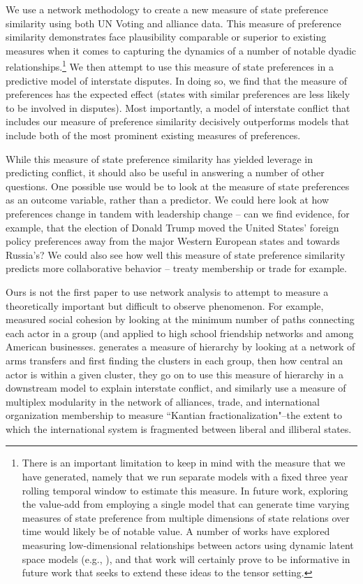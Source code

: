 \documentclass[12pt,pdflatex]{elsarticle}
\begin{document}
We use a network methodology to create a new measure of state preference similarity using both UN Voting and alliance data. This measure of preference similarity demonstrates face plausibility comparable or superior to existing measures when it comes to capturing the dynamics of a number of notable dyadic relationships.\footnote{There is an important limitation to keep in mind with the measure that we have generated, namely that we run separate models with a fixed three year rolling temporal window to estimate this measure. In future work, exploring the value-add from employing a single model that can generate time varying measures of state preference from multiple dimensions of state relations over time would likely be of notable value. A number of works have explored measuring low-dimensional relationships between actors using dynamic latent space models (e.g., \citealp{sewell:chen:2015}), and that work will certainly prove to be informative in future work that seeks to extend these ideas to the tensor setting.}  We then attempt to use this measure of state preferences in a predictive model of interstate disputes. In doing so, we find that the measure of preferences has the expected effect (states with similar preferences are less likely to be involved in disputes). Most importantly, a model of interstate conflict that includes our measure of preference similarity decisively outperforms models that include both of the most prominent existing measures of preferences.

While this measure of state preference similarity has yielded leverage in predicting conflict, it should also be useful in answering a number of other questions. One possible use would be to look at the measure of state preferences as an outcome variable, rather than a predictor. We could here look at how preferences change in tandem with leadership change -- can we find evidence, for example, that the election of Donald Trump moved the United States' foreign policy preferences away from the major Western European states and towards Russia's? We could also see how well this measure of state preference similarity predicts more collaborative behavior -- treaty membership or trade for example.

Ours is not the first paper to use network analysis to attempt to measure a theoretically important but difficult to observe phenomenon. For example, \citet{moody:white:2003} measured social cohesion by looking at the minimum number of paths connecting each actor in a group (and applied to high school friendship networks and among American businesses. \citet{beardsley:etal:2018} generates a measure of hierarchy by looking at a network of arms transfers and first finding the clusters in each group,  then how central an actor is within a given cluster, they go on to use this measure of hierarchy in a downstream model to explain interstate conflict, and similarly \citet{cranmer:etal:2015} use a measure of multiplex modularity in the network of alliances, trade, and international organization membership to measure ``Kantian fractionalization"--the extent to which the international system is fragmented between liberal and illiberal states.
\end{document}
